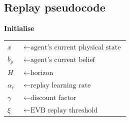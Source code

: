 \documentclass{article}
\begin{document}
\newpage

\subsection*{Replay pseudocode}

\textbf{Initialise}\\ 
\begin{tabular}{ll}
    $x$ & $\leftarrow \text{agent's current physical state}$\\
    $b_{\rho}$ & $\leftarrow \text{agent's current belief}$ \\
    $H$ & $\leftarrow \text{horizon}$\\ 
    $\alpha_r$ & $\leftarrow \text{replay learning rate}$\\
    $\gamma$ & $\leftarrow \text{discount factor}$\\ 
    $\xi$ & $\leftarrow \text{EVB replay threshold}$  
\end{tabular}
\end{document}
